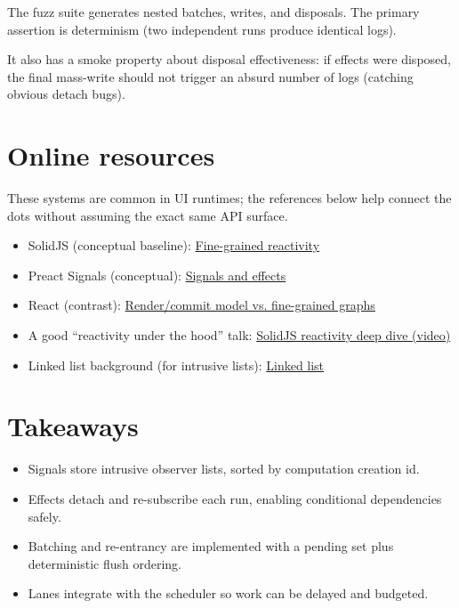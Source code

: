 The fuzz suite generates nested batches, writes, and disposals.
The primary assertion is determinism (two independent runs produce identical logs).

It also has a smoke property about disposal effectiveness: if effects were disposed, the final mass-write should not trigger an absurd number of logs (catching obvious detach bugs).

\section{Online resources}

These systems are common in UI runtimes; the references below help connect the dots without assuming the exact same API surface.

\begin{itemize}
  \item SolidJS (conceptual baseline): \href{https://www.solidjs.com/docs/latest#reactivity}{Fine-grained reactivity}
  \item Preact Signals (conceptual): \href{https://preactjs.com/guide/v10/signals/}{Signals and effects}
  \item React (contrast): \href{https://react.dev/learn/render-and-commit}{Render/commit model vs. fine-grained graphs}
  \item A good ``reactivity under the hood'' talk: \href{https://www.youtube.com/watch?v=2H5zYj1fM9U}{SolidJS reactivity deep dive (video)}
  \item Linked list background (for intrusive lists): \href{https://en.wikipedia.org/wiki/Linked_list}{Linked list}
\end{itemize}

\section{Takeaways}

\begin{itemize}
  \item Signals store intrusive observer lists, sorted by computation creation id.
  \item Effects detach and re-subscribe each run, enabling conditional dependencies safely.
  \item Batching and re-entrancy are implemented with a pending set plus deterministic flush ordering.
  \item Lanes integrate with the scheduler so work can be delayed and budgeted.
\end{itemize}

